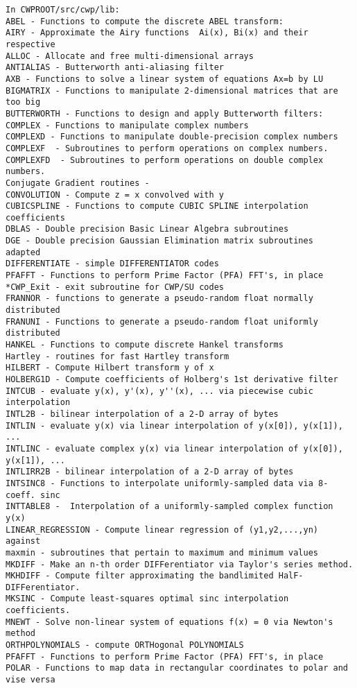 {\begin{verbatim}
In CWPROOT/src/cwp/lib:
ABEL - Functions to compute the discrete ABEL transform:
AIRY - Approximate the Airy functions  Ai(x), Bi(x) and their respective
ALLOC - Allocate and free multi-dimensional arrays
ANTIALIAS - Butterworth anti-aliasing filter
AXB - Functions to solve a linear system of equations Ax=b by LU
BIGMATRIX - Functions to manipulate 2-dimensional matrices that are too big 
BUTTERWORTH - Functions to design and apply Butterworth filters:
COMPLEX - Functions to manipulate complex numbers
COMPLEXD - Functions to manipulate double-precision complex numbers
COMPLEXF  - Subroutines to perform operations on complex numbers.
COMPLEXFD  - Subroutines to perform operations on double complex numbers.
Conjugate Gradient routines -
CONVOLUTION - Compute z = x convolved with y
CUBICSPLINE - Functions to compute CUBIC SPLINE interpolation coefficients
DBLAS - Double precision Basic Linear Algebra subroutines
DGE - Double precision Gaussian Elimination matrix subroutines  adapted
DIFFERENTIATE - simple DIFFERENTIATOR codes
PFAFFT - Functions to perform Prime Factor (PFA) FFT's, in place
*CWP_Exit - exit subroutine for CWP/SU codes
FRANNOR - functions to generate a pseudo-random float normally distributed
FRANUNI - Functions to generate a pseudo-random float uniformly distributed
HANKEL - Functions to compute discrete Hankel transforms
Hartley - routines for fast Hartley transform
HILBERT - Compute Hilbert transform y of x
HOLBERG1D - Compute coefficients of Holberg's 1st derivative filter
INTCUB - evaluate y(x), y'(x), y''(x), ... via piecewise cubic interpolation
INTL2B - bilinear interpolation of a 2-D array of bytes
INTLIN - evaluate y(x) via linear interpolation of y(x[0]), y(x[1]), ...
INTLINC - evaluate complex y(x) via linear interpolation of y(x[0]), y(x[1]), ...
INTLIRR2B - bilinear interpolation of a 2-D array of bytes
INTSINC8 - Functions to interpolate uniformly-sampled data via 8-coeff. sinc
INTTABLE8 -  Interpolation of a uniformly-sampled complex function y(x)
LINEAR_REGRESSION - Compute linear regression of (y1,y2,...,yn) against 
maxmin - subroutines that pertain to maximum and minimum values
MKDIFF - Make an n-th order DIFFerentiator via Taylor's series method.
MKHDIFF - Compute filter approximating the bandlimited HalF-DIFFerentiator.
MKSINC - Compute least-squares optimal sinc interpolation coefficients.
MNEWT - Solve non-linear system of equations f(x) = 0 via Newton's method
ORTHPOLYNOMIALS - compute ORTHogonal POLYNOMIALS
PFAFFT - Functions to perform Prime Factor (PFA) FFT's, in place
POLAR - Functions to map data in rectangular coordinates to polar and vise versa

\end{verbatim}}
